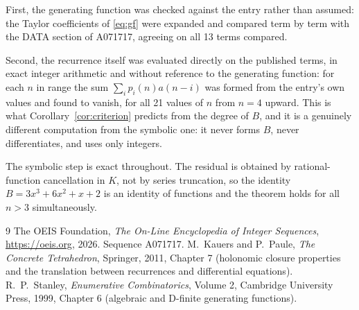 \documentclass[11pt,a4paper]{article}
\theoremstyle{plain}
\theoremstyle{definition}
\begin{document}
First, the generating function was checked against the entry rather than assumed: the
Taylor coefficients of \eqref{eq:gf} were expanded and compared term by term with the DATA
section of A071717, agreeing on all 13 terms compared.

Second, the recurrence itself was evaluated directly on the published terms, in exact
integer arithmetic and without reference to the generating function: for each $n$ in range
the sum $\sum_{i}p_{i}(n)a(n-i)$ was formed from the entry's own values and found to
vanish, for all 21 values of $n$ from $n=4$ upward. This is what
Corollary~\ref{cor:criterion} predicts from the degree of $B$, and it is a genuinely
different computation from the symbolic one: it never forms $B$, never differentiates, and
uses only integers.

The symbolic step is exact throughout. The residual is obtained by rational-function
cancellation in $K$, not by series truncation, so the identity $B=3 x^{3} + 6 x^{2} + x + 2$ is an
identity of functions and the theorem holds for all $n>3$ simultaneously.

\begin{thebibliography}{9}
 The OEIS Foundation, \emph{The On-Line Encyclopedia of Integer Sequences},
\url{https://oeis.org}, 2026. Sequence A071717.
 M.~Kauers and P.~Paule, \emph{The Concrete Tetrahedron}, Springer, 2011,
Chapter 7 (holonomic closure properties and the translation between recurrences and
differential equations).
 R.~P.~Stanley, \emph{Enumerative Combinatorics}, Volume 2, Cambridge
University Press, 1999, Chapter 6 (algebraic and D-finite generating functions).
\end{thebibliography}
\end{document}

